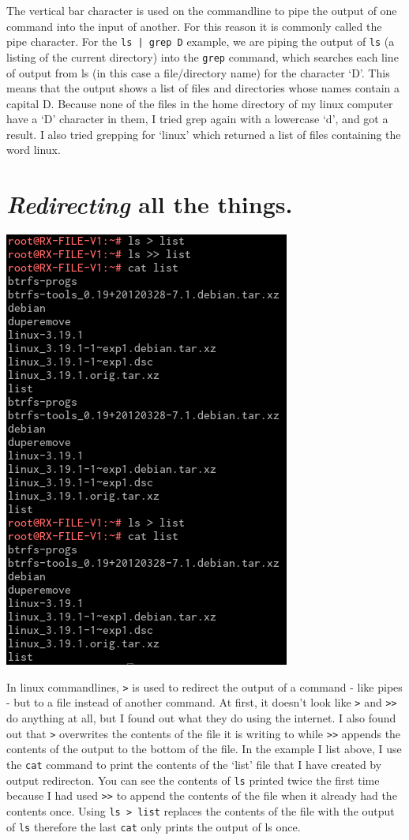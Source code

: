 \documentclass[11pt,twoside,a4paper]{article}
\begin{document}
		The vertical bar character is used on the commandline to pipe the output of one command into the input of another. For this reason it is commonly called the pipe character. For the \verb!ls | grep D! example, we are piping the output of \verb|ls| (a listing of the current directory) into the \verb|grep| command, which searches each line of output from ls (in this case a file/directory name) for the character `D'. This means that the output shows a list of files and directories whose names contain a capital D. Because none of the files in the home directory of my linux computer have a `D' character in them, I tried grep again with a lowercase `d', and got a result. I also tried grepping for `linux' which returned a list of files containing the word linux.

	\section{\emph{Redirecting} all the things.}

		\includegraphics{redirection}

		In linux commandlines, \verb|>| is used to redirect the output of a command - like pipes - but to a file instead of another command.\cite{lts-redirection} At first, it doesn't look like \verb|>| and \verb|>>| do anything at all, but I found out what they do using the internet. I also found out that \verb|>| overwrites the contents of the file it is writing to while \verb|>>| appends the contents of the output to the bottom of the file. In the example I list above, I use the \verb|cat| command to print the contents of the `list' file that I have created by output redirecton. You can see the contents of \verb|ls| printed twice the first time because I had used \verb|>>| to append the contents of the file when it already had the contents once. Using \verb|ls > list| replaces the contents of the file with the output of \verb|ls| therefore the last \verb|cat| only prints the output of ls once.
\end{document}
